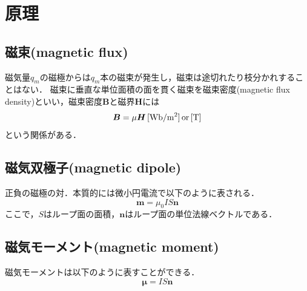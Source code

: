 \clearpage

\section{原理}
\subsection{磁束(magnetic flux)\cite{113028227042}}
磁気量$q_{m}$の磁極からは$q_{m}$本の磁束が発生し，磁束は途切れたり枝分かれすることはない．
磁束に垂直な単位面積の面を貫く磁束を磁束密度(magnetic flux density)といい，磁束密度$\boldsymbol{B}$と磁界$\boldsymbol{H}$には
\begin{equation}
	\boldsymbol{B}=\mu\boldsymbol{H}\,[\rm{Wb/m^{2}}] \,or\, [\rm{T}] 
\end{equation}
という関係がある．

\subsection{磁気双極子(magnetic dipole)\cite{7652}}
正負の磁極の対．本質的には微小円電流で以下のように表される．
\begin{equation}
	\boldsymbol{m}=\mu_{0}IS\boldsymbol{n}
\end{equation}
ここで，$S$はループ面の面積，$\boldsymbol{n}$はループ面の単位法線ベクトルである．

\subsection{磁気モーメント(magnetic moment)\cite{7652}\cite{113028227162}}
磁気モーメントは以下のように表すことができる．
\begin{equation}
	\boldsymbol{\mu}=IS\boldsymbol{n}
\end{equation}

